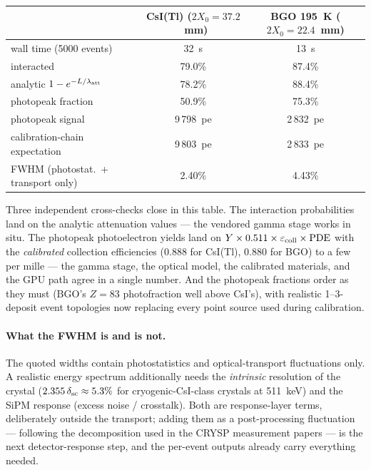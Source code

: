 \documentclass[11pt,a4paper]{article}
\newcommand{\csitl}{CsI(Tl)}
\begin{document}
\begin{center}
\begin{tabular}{lcc}
  \toprule
   & \csitl{} ($2X_0 = 37.2$~mm) & BGO 195~K ($2X_0 = 22.4$~mm) \\
  \midrule
  wall time (5000 events)      & 32~s & 13~s \\
  interacted                   & 79.0\% & 87.4\% \\
  \quad analytic $1 - e^{-L/\lambda_{\rm att}}$ & 78.2\% & 88.4\% \\
  photopeak fraction           & 50.9\% & 75.3\% \\
  photopeak signal             & 9\,798~pe & 2\,832~pe \\
  \quad calibration-chain expectation & 9\,803~pe & 2\,833~pe \\
  FWHM (photostat.\ + transport only) & 2.40\% & 4.43\% \\
  \bottomrule
\end{tabular}
\end{center}

Three independent cross-checks close in this table. The interaction probabilities land
on the analytic attenuation values --- the vendored gamma stage works in situ. The
photopeak photoelectron yields land on
$Y \times 0.511 \times \varepsilon_{\rm coll} \times \mathrm{PDE}$ with the
\emph{calibrated} collection efficiencies (0.888 for \csitl{}, 0.880 for BGO) to a few
per mille --- the gamma stage, the optical model, the calibrated materials, and the
GPU path agree in a single number. And the photopeak fractions order as they must
(BGO's $Z=83$ photofraction well above CsI's), with realistic 1--3-deposit event
topologies now replacing every point source used during calibration.

\paragraph{What the FWHM is and is not.} The quoted widths contain photostatistics and
optical-transport fluctuations only. A realistic energy spectrum additionally needs
the \emph{intrinsic} resolution of the crystal ($2.355\,\delta_{\rm sc} \approx 5.3\%$
for cryogenic-CsI-class crystals at 511~keV) and the SiPM response (excess noise /
crosstalk). Both are response-layer terms, deliberately outside the transport; adding
them as a post-processing fluctuation --- following the decomposition used in the CRYSP
measurement papers --- is the next detector-response step, and the per-event outputs already carry everything
needed.
\end{document}
